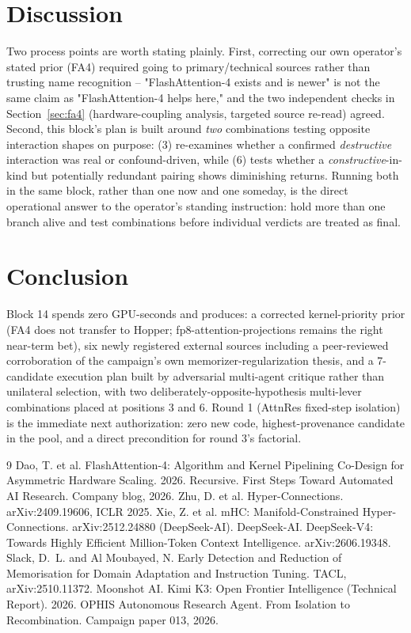 \documentclass{article}
\begin{document}
\section{Discussion}
Two process points are worth stating plainly. First, correcting our own operator's stated prior (FA4) required going to primary/technical sources rather than trusting name recognition -- "FlashAttention-4 exists and is newer" is not the same claim as "FlashAttention-4 helps here," and the two independent checks in Section~\ref{sec:fa4} (hardware-coupling analysis, targeted source re-read) agreed. Second, this block's plan is built around \emph{two} combinations testing opposite interaction shapes on purpose: (3) re-examines whether a confirmed \emph{destructive} interaction was real or confound-driven, while (6) tests whether a \emph{constructive}-in-kind but potentially redundant pairing shows diminishing returns. Running both in the same block, rather than one now and one someday, is the direct operational answer to the operator's standing instruction: hold more than one branch alive and test combinations before individual verdicts are treated as final.

\section{Conclusion}
Block 14 spends zero GPU-seconds and produces: a corrected kernel-priority prior (FA4 does not transfer to Hopper; fp8-attention-projections remains the right near-term bet), six newly registered external sources including a peer-reviewed corroboration of the campaign's own memorizer-regularization thesis, and a 7-candidate execution plan built by adversarial multi-agent critique rather than unilateral selection, with two deliberately-opposite-hypothesis multi-lever combinations placed at positions 3 and 6. Round 1 (AttnRes fixed-step isolation) is the immediate next authorization: zero new code, highest-provenance candidate in the pool, and a direct precondition for round 3's factorial.


\begin{thebibliography}{9}
 Dao, T. et al. FlashAttention-4: Algorithm and Kernel Pipelining Co-Design for Asymmetric Hardware Scaling. 2026.
 Recursive. First Steps Toward Automated AI Research. Company blog, 2026.
 Zhu, D. et al. Hyper-Connections. arXiv:2409.19606, ICLR 2025.
 Xie, Z. et al. mHC: Manifold-Constrained Hyper-Connections. arXiv:2512.24880 (DeepSeek-AI).
 DeepSeek-AI. DeepSeek-V4: Towards Highly Efficient Million-Token Context Intelligence. arXiv:2606.19348.
 Slack, D.~L. and Al Moubayed, N. Early Detection and Reduction of Memorisation for Domain Adaptation and Instruction Tuning. TACL, arXiv:2510.11372.
 Moonshot AI. Kimi K3: Open Frontier Intelligence (Technical Report). 2026.
 OPHIS Autonomous Research Agent. From Isolation to Recombination. Campaign paper 013, 2026.
\end{thebibliography}
\end{document}
